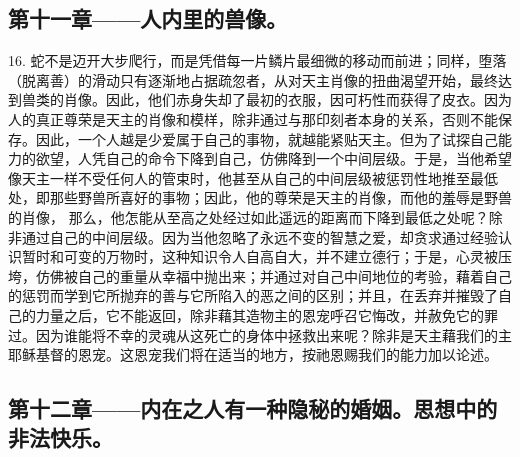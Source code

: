\subsection{第十一章——人内里的兽像。}

16. 蛇不是迈开大步爬行，而是凭借每一片鳞片最细微的移动而前进；同样，堕落（脱离善）的滑动只有逐渐地占据疏忽者，从对天主肖像的扭曲渴望开始，最终达到兽类的肖像。因此，他们赤身失却了最初的衣服，因可朽性而获得了皮衣。因为人的真正尊荣是天主的肖像和模样，除非通过与那印刻者本身的关系，否则不能保存。因此，一个人越是少爱属于自己的事物，就越能紧贴天主。但为了试探自己能力的欲望，人凭自己的命令下降到自己，仿佛降到一个中间层级。于是，当他希望像天主一样不受任何人的管束时，他甚至从自己的中间层级被惩罚性地推至最低处，即那些野兽所喜好的事物；因此，他的尊荣是天主的肖像，而他的羞辱是野兽的肖像， 那么，他怎能从至高之处经过如此遥远的距离而下降到最低之处呢？除非通过自己的中间层级。因为当他忽略了永远不变的智慧之爱，却贪求通过经验认识暂时和可变的万物时，这种知识令人自高自大，并不建立德行；于是，心灵被压垮，仿佛被自己的重量从幸福中抛出来；并通过对自己中间地位的考验，藉着自己的惩罚而学到它所抛弃的善与它所陷入的恶之间的区别；并且，在丢弃并摧毁了自己的力量之后，它不能返回，除非藉其造物主的恩宠呼召它悔改，并赦免它的罪过。因为谁能将不幸的灵魂从这死亡的身体中拯救出来呢？除非是天主藉我们的主耶稣基督的恩宠。这恩宠我们将在适当的地方，按祂恩赐我们的能力加以论述。\par


\subsection{第十二章——内在之人有一种隐秘的婚姻。思想中的非法快乐。}

